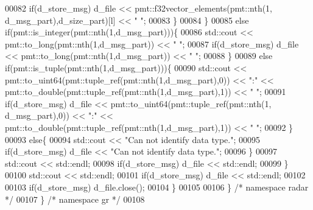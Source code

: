 \begin{DoxyCode}
00082                     \textcolor{keywordflow}{if}(d_store_msg) d_file << pmt::f32vector\_elements(pmt::nth(1,
      d_msg_part),d\_size\_part)[l] << \textcolor{stringliteral}{" "};
00083                 \}
00084             \}
00085             \textcolor{keywordflow}{else} \textcolor{keywordflow}{if}(pmt::is\_integer(pmt::nth(1,d_msg_part)))\{
00086                 std::cout << pmt::to\_long(pmt::nth(1,d_msg_part)) << \textcolor{stringliteral}{" "};
00087                 \textcolor{keywordflow}{if}(d_store_msg) d_file << pmt::to\_long(pmt::nth(1,d_msg_part)) << \textcolor{stringliteral}{" "};
00088             \}
00089             \textcolor{keywordflow}{else} \textcolor{keywordflow}{if}(pmt::is\_tuple(pmt::nth(1,d_msg_part)))\{
00090                 std::cout << pmt::to\_uint64(pmt::tuple\_ref(pmt::nth(1,d_msg_part),0)) << \textcolor{stringliteral}{":"} << 
      pmt::to\_double(pmt::tuple\_ref(pmt::nth(1,d_msg_part),1)) << \textcolor{stringliteral}{" "};
00091                 \textcolor{keywordflow}{if}(d_store_msg) d_file << pmt::to\_uint64(pmt::tuple\_ref(pmt::nth(1,
      d_msg_part),0)) << \textcolor{stringliteral}{":"} << pmt::to\_double(pmt::tuple\_ref(pmt::nth(1,d_msg_part),1)) << \textcolor{stringliteral}{" "};
00092             \}
00093             \textcolor{keywordflow}{else}\{
00094                 std::cout << \textcolor{stringliteral}{"Can not identify data type."};
00095                 \textcolor{keywordflow}{if}(d_store_msg) d_file << \textcolor{stringliteral}{"Can not identify data type."};
00096             \}
00097             std::cout << std::endl;
00098             \textcolor{keywordflow}{if}(d_store_msg) d_file << std::endl;
00099         \}
00100         std::cout << std::endl;
00101         \textcolor{keywordflow}{if}(d_store_msg) d_file << std::endl;
00102         
00103         \textcolor{keywordflow}{if}(d_store_msg) d_file.close();
00104     \}
00105 
00106   \} \textcolor{comment}{/* namespace radar */}
00107 \} \textcolor{comment}{/* namespace gr */}
00108 
\end{DoxyCode}
